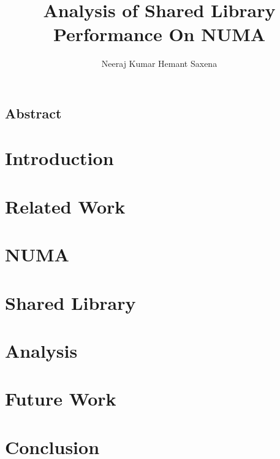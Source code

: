 \documentclass{acm_proc_article-sp}
\title{Analysis of Shared Library Performance On NUMA}
\author{
Neeraj Kumar
\alignauthor
Hemant Saxena
}
\begin{document}
\maketitle

\subsection*{Abstract}


\section{Introduction}


\section{Related Work}


\section{NUMA}


\section{Shared Library}


\section{Analysis}


\section{Future Work}


\section{Conclusion}




\end{document}
